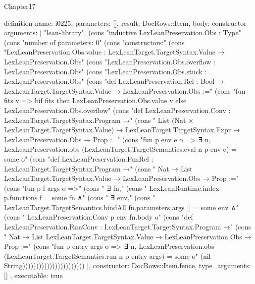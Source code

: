 \begin{lexlean}{Chapter17}
\begin{semanticmodule}
definition{
  name: i0225,
  parameters: [],
  result: DocRows::Item,
  body: constructor{
    arguments: [
      "lean-library",
      (cons "inductive LexLeanPreservation.Obs : Type" (cons "number of parameters: 0" (cons "constructors:" (cons "LexLeanPreservation.Obs.value : LexLeanTarget.TargetSyntax.Value → LexLeanPreservation.Obs" (cons "LexLeanPreservation.Obs.overflow : LexLeanPreservation.Obs" (cons "LexLeanPreservation.Obs.stuck : LexLeanPreservation.Obs" (cons "def LexLeanPreservation.Rel : Bool → LexLeanTarget.TargetSyntax.Value → LexLeanPreservation.Obs :=" (cons "fun fits v => bif fits then LexLeanPreservation.Obs.value v else LexLeanPreservation.Obs.overflow" (cons "def LexLeanPreservation.Conv : LexLeanTarget.TargetSyntax.Program →" (cons "  List (Nat × LexLeanTarget.TargetSyntax.Value) → LexLeanTarget.TargetSyntax.Expr → LexLeanPreservation.Obs → Prop :=" (cons "fun p env e o => ∃ n, LexLeanPreservation.obs (LexLeanTarget.TargetSemantics.eval n p env e) = some o" (cons "def LexLeanPreservation.FunRel : LexLeanTarget.TargetSyntax.Program →" (cons "  Nat → List LexLeanTarget.TargetSyntax.Value → LexLeanPreservation.Obs → Prop :=" (cons "fun p f args o =>" (cons "  ∃ fn," (cons "    LexLeanRuntime.index p.functions f = some fn ∧" (cons "      ∃ env," (cons "        LexLeanTarget.TargetSemantics.bindAll fn.parameters args [] = some env ∧" (cons "          LexLeanPreservation.Conv p env fn.body o" (cons "def LexLeanPreservation.RunConv : LexLeanTarget.TargetSyntax.Program →" (cons "  Nat → List LexLeanTarget.TargetSyntax.Value → LexLeanPreservation.Obs → Prop :=" (cons "fun p entry args o => ∃ n, LexLeanPreservation.obs (LexLeanTarget.TargetSemantics.run n p entry args) = some o" (nil String)))))))))))))))))))))))
    ],
    constructor: DocRows::Item.fence,
    type_arguments: []
  },
  executable: true
}


\end{semanticmodule}
\end{lexlean}
